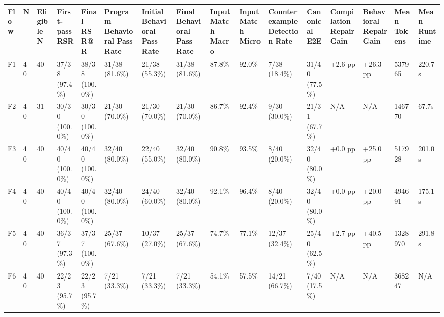 \begin{longtable}{llllllllllllllll}
Flow & N & Eligible N & First-pass RSR & Final RSR@R & Program Behavioral Pass Rate & Initial Behavioral Pass Rate & Final Behavioral Pass Rate & Input Match Macro & Input Match Micro & Counterexample Detection Rate & Canonical E2E & Compilation Repair Gain & Behavioral Repair Gain & Mean Tokens & Mean Runtime \\ \hline
F1 & 40 & 40 & 37/38 (97.4\%) & 38/38 (100.0\%) & 31/38 (81.6\%) & 21/38 (55.3\%) & 31/38 (81.6\%) & 87.8\% & 92.0\% & 7/38 (18.4\%) & 31/40 (77.5\%) & +2.6 pp & +26.3 pp & 537965 & 220.7s \\
F2 & 40 & 31 & 30/30 (100.0\%) & 30/30 (100.0\%) & 21/30 (70.0\%) & 21/30 (70.0\%) & 21/30 (70.0\%) & 86.7\% & 92.4\% & 9/30 (30.0\%) & 21/31 (67.7\%) & N/A & N/A & 146770 & 67.7s \\
F3 & 40 & 40 & 40/40 (100.0\%) & 40/40 (100.0\%) & 32/40 (80.0\%) & 22/40 (55.0\%) & 32/40 (80.0\%) & 90.8\% & 93.5\% & 8/40 (20.0\%) & 32/40 (80.0\%) & +0.0 pp & +25.0 pp & 517928 & 201.0s \\
F4 & 40 & 40 & 40/40 (100.0\%) & 40/40 (100.0\%) & 32/40 (80.0\%) & 24/40 (60.0\%) & 32/40 (80.0\%) & 92.1\% & 96.4\% & 8/40 (20.0\%) & 32/40 (80.0\%) & +0.0 pp & +20.0 pp & 494691 & 175.1s \\
F5 & 40 & 40 & 36/37 (97.3\%) & 37/37 (100.0\%) & 25/37 (67.6\%) & 10/37 (27.0\%) & 25/37 (67.6\%) & 74.7\% & 77.1\% & 12/37 (32.4\%) & 25/40 (62.5\%) & +2.7 pp & +40.5 pp & 1328970 & 291.8s \\
F6 & 40 & 40 & 22/23 (95.7\%) & 22/23 (95.7\%) & 7/21 (33.3\%) & 7/21 (33.3\%) & 7/21 (33.3\%) & 54.1\% & 57.5\% & 14/21 (66.7\%) & 7/40 (17.5\%) & N/A & N/A & 368247 & N/A \\
\end{longtable}
